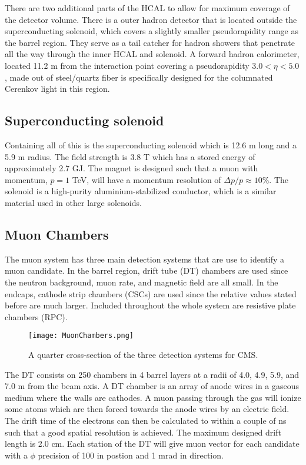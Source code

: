 There are two additional parts of the HCAL to allow for maximum coverage of the detector volume. There is a outer hadron detector that is located outside the superconducting solenoid, which covers a slightly smaller pseudorapidity range as the barrel region. They serve as a tail catcher for hadron showers that penetrate all the way through the inner HCAL and solenoid. A forward hadron calorimeter, located 11.2 m from the interaction point covering a pseudorapidity $3.0<\eta<5.0$, made out of steel/quartz fiber is specifically designed for the columnated Cerenkov light in this region. 

\subsection{Superconducting solenoid}
\label{sec:Solenoid}

Containing all of this is the superconducting solenoid which is 12.6 m long and a 5.9 m radius. The field strength is 3.8 T which has a stored energy of approximately 2.7 GJ. The magnet is designed such that a muon with momentum, $p=1$ TeV, will have a momentum resolution of $\Delta p/p\approx10\%$. The solenoid is a high-purity aluminium-stabilized conductor, which is a similar material used in other large solenoids. 

\subsection{Muon Chambers}
\label{sec:muCham}

The muon system has three main detection systems that are use to identify a muon candidate. In the barrel region, drift tube (DT) chambers are used since the neutron background, muon rate, and magnetic field are all small. In the endcaps, cathode strip chambers (CSCs) are used since the relative values stated before are much larger. Included throughout the whole system are resistive plate chambers (RPC). 

\begin{figure}
 	\centering
	\texttt{[image: MuonChambers.png]}
 	\caption{A quarter cross-section of the three detection systems for CMS. }
 	\label{MuonChambers} 
\end{figure}

The DT consists on 250 chambers in 4 barrel layers at a radii of 4.0, 4.9, 5.9, and 7.0 m from the beam axis. A DT chamber is an array of anode wires in a gaseous medium where the walls are cathodes. A muon passing through the gas will ionize some atoms which are then forced towards the anode wires by an electric field. The drift time of the electrons can then be calculated to within a couple of ns such that a good spatial resolution is achieved. The maximum designed drift length is 2.0 cm. Each station of the DT will give muon vector for each candidate with a $\phi$ precision of 100 \mum in postion and 1 mrad in direction. 

